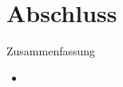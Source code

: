 \documentclass{beamer}
\begin{document}
%
%		
%		
%		

%				
%				
%				
%				
%			
%			
%	


\section{Abschluss}
\begin{frame}{Zusammenfassung}
	\begin{itemize}
		\item 
	\end{itemize}
\end{frame}
\end{document}
